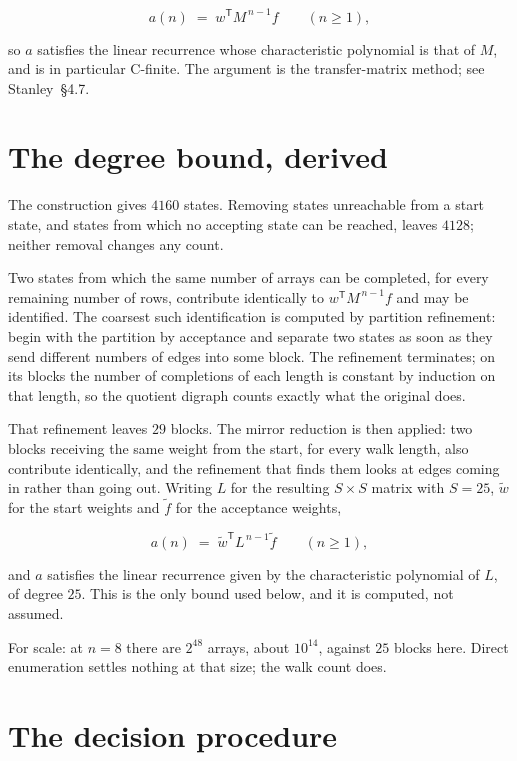 \documentclass[11pt]{article}
\theoremstyle{definition}
\begin{document}
\[a(n) \;=\; w^{\mathsf T} M^{\,n-1} f \qquad (n \ge 1),\]

so $a$ satisfies the linear recurrence whose characteristic polynomial is that of $M$, and is in particular C-finite. The argument is the transfer-matrix method; see Stanley~\S4.7.

\section{The degree bound, derived}

The construction gives $4160$ states. Removing states unreachable from a start state, and states from which no accepting state can be reached, leaves $4128$; neither removal changes any count.

Two states from which the same number of arrays can be completed, for every remaining number of rows, contribute identically to $w^{\mathsf T}M^{\,n-1}f$ and may be identified. The coarsest such identification is computed by partition refinement: begin with the partition by acceptance and separate two states as soon as they send different numbers of edges into some block. The refinement terminates; on its blocks the number of completions of each length is constant by induction on that length, so the quotient digraph counts exactly what the original does.

That refinement leaves $29$ blocks. The mirror reduction is then applied: two blocks receiving the same weight from the start, for every walk length, also contribute identically, and the refinement that finds them looks at edges coming in rather than going out. Writing $L$ for the resulting $S \times S$ matrix with $S = 25$, $\tilde w$ for the start weights and $\tilde f$ for the acceptance weights,

\[a(n) \;=\; \tilde w^{\mathsf T} L^{\,n-1} \tilde f \qquad (n \ge 1),\]

and $a$ satisfies the linear recurrence given by the characteristic polynomial of $L$, of degree $25$. This is the only bound used below, and it is computed, not assumed.

For scale: at $n = 8$ there are $2^{48}$ arrays, about $10^{14}$, against $25$ blocks here. Direct enumeration settles nothing at that size; the walk count does.

\section{The decision procedure}
\end{document}
